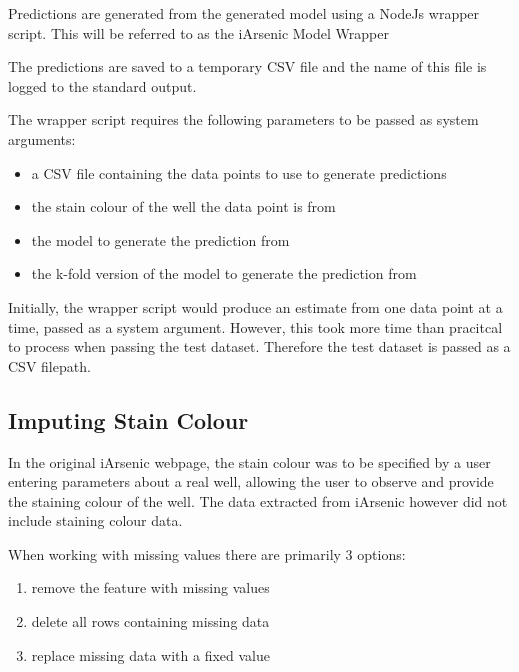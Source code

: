 Predictions are generated from the generated model using a NodeJs wrapper script. This will be referred to as the iArsenic Model Wrapper

The predictions are saved to a temporary CSV file and the name of this file is logged to the standard output.

The wrapper script requires the following parameters to be passed as system arguments:
\begin{itemize}
  \item a CSV file containing the data points to use to generate predictions
  \item the stain colour of the well the data point is from
  \item the model to generate the prediction from
  \item the k-fold version of the model to generate the prediction from
\end{itemize}

Initially, the wrapper script would produce an estimate from one data point at a time, passed as a system argument. However, this took more time than pracitcal to process when passing the test dataset. Therefore the test dataset is passed as a CSV filepath.


\subsection{Imputing Stain Colour}

In the original iArsenic webpage, the stain colour was to be specified by a user entering parameters about a real well, allowing the user to observe and provide the staining colour of the well. The data extracted from iArsenic however did not include staining colour data. 

When working with missing values there are primarily 3 options: 

\begin{enumerate}
    \item remove the feature with missing values
    \item delete all rows containing missing data
    \item replace missing data with a fixed value
\end{enumerate}

